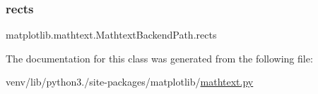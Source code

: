 \subsubsection{\texorpdfstring{rects}{rects}}
{\footnotesize\ttfamily matplotlib.\+mathtext.\+Mathtext\+Backend\+Path.\+rects}



The documentation for this class was generated from the following file\+:\begin{DoxyCompactItemize}
\item 
venv/lib/python3./site-\/packages/matplotlib/\hyperlink{mathtext_8py}{mathtext.\+py}\end{DoxyCompactItemize}
